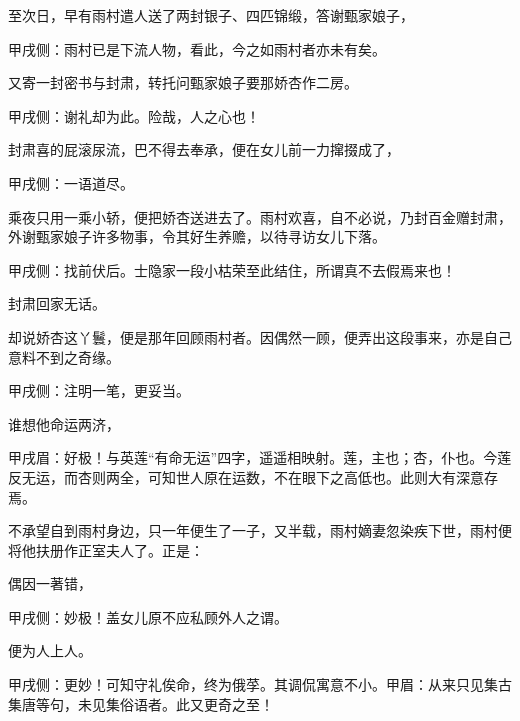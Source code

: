 \begin{parag}
    至次日，早有雨村遣人送了两封银子、四匹锦缎，答谢甄家娘子，\begin{note}甲戌侧：雨村已是下流人物，看此，今之如雨村者亦未有矣。\end{note}又寄一封密书与封肃，转托问甄家娘子要那娇杏作二房。\begin{note}甲戌侧：谢礼却为此。险哉，人之心也！\end{note}封肃喜的屁滚尿流，巴不得去奉承，便在女儿前一力撺掇成了，\begin{note}甲戌侧：一语道尽。\end{note}乘夜只用一乘小轿，便把娇杏送进去了。雨村欢喜，自不必说，乃封百金赠封肃，外谢甄家娘子许多物事，令其好生养赡，以待寻访女儿下落。\begin{note}甲戌侧：找前伏后。士隐家一段小枯荣至此结住，所谓真不去假焉来也！\end{note}封肃回家无话。
\end{parag}


\begin{parag}
    却说娇杏这丫鬟，便是那年回顾雨村者。因偶然一顾，便弄出这段事来，亦是自己意料不到之奇缘。\begin{note}甲戌侧：注明一笔，更妥当。\end{note}谁想他命运两济，\begin{note}甲戌眉：好极！与英莲“有命无运”四字，遥遥相映射。莲，主也；杏，仆也。今莲反无运，而杏则两全，可知世人原在运数，不在眼下之高低也。此则大有深意存焉。\end{note}不承望自到雨村身边，只一年便生了一子，又半载，雨村嫡妻忽染疾下世，雨村便将他扶册作正室夫人了。正是：
\end{parag}


\begin{poem}
    \begin{pl}偶因一著错，\end{pl}\begin{note}甲戌侧：妙极！盖女儿原不应私顾外人之谓。\end{note}

    \begin{pl}便为人上人。\end{pl}\begin{note}甲戌侧：更妙！可知守礼俟命，终为俄莩。其调侃寓意不小。甲眉：从来只见集古集唐等句，未见集俗语者。此又更奇之至！\end{note}

\end{poem}


